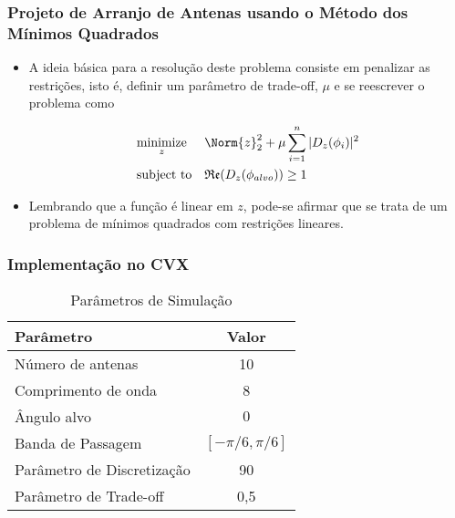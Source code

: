 \begin{frame}
\frametitle{Projeto de Arranjo de Antenas usando o Método dos M\'inimos Quadrados}
\begin{itemize}
\item A ideia básica para a resolução deste problema consiste em penalizar as restri\c{c}\~oes, isto é, definir um parâmetro de trade-off, $\mu$ e se reescrever o problema como

\begin{equation*}
\begin{aligned}
& \underset{z}{\text{minimize}}
&& \Norm{z}_{2}^{2} + \mu \sum_{i = 1}^{n}|D_{z}(\phi_{i})|^{2} \\
& \text{subject to}
&& \mathfrak{Re}(D_{z}(\phi_{alvo})) \geq 1 \\
\end{aligned}
\end{equation*}

\item Lembrando que a função é linear em $z$, pode-se afirmar que se trata de um problema de m\'inimos quadrados com restri\c{c}\~oes lineares. 
\end{itemize}
\end{frame}

\begin{frame}
\frametitle{Implementação no CVX}

\begin{table}[!tb]
\centering
\caption{Parâmetros de Simulação}
\centering
\small
\begin{tabular}{l|c}
\hline
\hline
\textbf{Parâmetro} & \textbf{Valor}\\
\hline
N\'umero de antenas & 10\\
\hline
Comprimento de onda & 8\\
\hline
\^Angulo alvo & $0$\\
\hline
Banda de Passagem & $\left[- \pi / 6, \pi / 6\right]$\\
\hline
Parâmetro de Discretização & 90\\
\hline
Parâmetro de Trade-off & 0,5\\
\hline
\hline
\end{tabular}
\end{table}

\end{frame}

%

